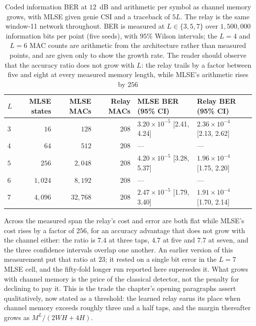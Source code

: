 \begin{table}[htbp]
\centering
\caption[Cost and accuracy against channel memory]{Coded information BER at $12$~dB and arithmetic per symbol as channel memory grows, with MLSE given genie CSI and a traceback of $5L$. The relay is the same window-11 network throughout. BER is measured at $L \in \{3,5,7\}$ over $1{,}500{,}000$ information bits per point (five seeds), with $95\%$ Wilson intervals; the $L=4$ and $L=6$ MAC counts are arithmetic from the architecture rather than measured points, and are given only to show the growth rate. The reader should observe that the accuracy ratio does not grow with $L$: the relay trails by a factor between five and eight at every measured memory length, while MLSE's arithmetic rises by $256$}\label{tbl:joint-memory}
\begin{tabular}{lrrrll}
\toprule
$L$ & MLSE states & MLSE MACs & Relay MACs & MLSE BER (95\% CI) & Relay BER (95\% CI) \\
\midrule
$3$ & $16$      & $128$      & $208$ & $3.20\times10^{-5}$ \tiny{[2.41, 4.24]} & $2.36\times10^{-4}$ \tiny{[2.13, 2.62]} \\
$4$ & $64$      & $512$      & $208$ & ---                                     & ---                                     \\
$5$ & $256$     & $2{,}048$  & $208$ & $4.20\times10^{-5}$ \tiny{[3.28, 5.37]} & $1.96\times10^{-4}$ \tiny{[1.75, 2.20]} \\
$6$ & $1{,}024$ & $8{,}192$  & $208$ & ---                                     & ---                                     \\
$7$ & $4{,}096$ & $32{,}768$ & $208$ & $2.47\times10^{-5}$ \tiny{[1.79, 3.40]} & $1.91\times10^{-4}$ \tiny{[1.70, 2.14]} \\
\bottomrule
\end{tabular}
\end{table}

Across the measured span the relay's cost and error are both flat while MLSE's cost rises by a factor of $256$, for an accuracy advantage that does not grow with the channel either: the ratio is $7.4$ at three taps, $4.7$ at five and $7.7$ at seven, and the three confidence intervals overlap one another. An earlier version of this measurement put that ratio at $23$; it rested on a single bit error in the $L=7$ MLSE cell, and the fifty-fold longer run reported here supersedes it. What grows with channel memory is the price of the classical detector, not the penalty for declining to pay it. This is the trade the chapter's opening paragraphs assert qualitatively, now stated as a threshold: the learned relay earns its place when channel memory exceeds roughly three and a half taps, and the margin thereafter grows as $M^{L}/(2WH + 4H)$.

